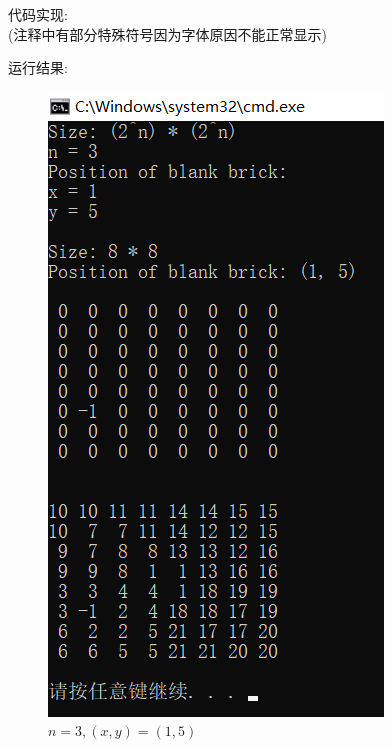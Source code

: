 \documentclass[a4paper]{ctexart}
\begin{document}
\begin{sloppypar}
    代码实现:\\
    (注释中有部分特殊符号因为字体原因不能正常显示)
    
    \vspace{1em}

    运行结果:
    \begin{figure}[h]
        \centering
        \includegraphics[scale=0.9]{images/test1.png}
        \caption{$n = 3, (x, y) = (1, 5)$}
    \end{figure}
    \begin{figure}[h]
        \centering

\end{figure}
\end{sloppypar}
\end{document}
